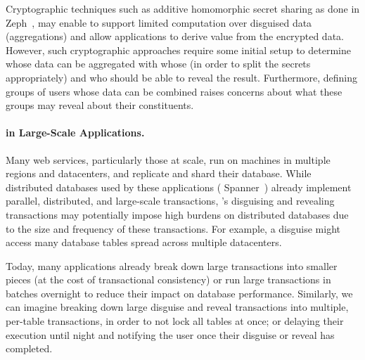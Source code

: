 
%
Cryptographic techniques such as additive homomorphic secret sharing as done in
Zeph~\cite{zeph}, may enable \sys to support limited computation over disguised
data (\eg aggregations) and allow applications to derive value from the
encrypted data.
%
However, such cryptographic approaches require some initial setup to determine
whose data can be aggregated with whose (in order to split the secrets
appropriately) and who should be able to reveal the result. Furthermore, defining
groups of users whose data can be combined raises concerns about what these
groups may reveal about their constituents.
%

\vspace{-5pt}
\paragraph{\sys in Large-Scale Applications.}
Many web services, particularly those at scale, run on machines in multiple 
regions and datacenters, and replicate and shard their database.
%
While distributed databases used by these applications (\eg
Spanner~\cite{spanner}) already implement parallel, distributed, and large-scale
transactions, \sys's disguising and revealing transactions may potentially
impose high burdens on distributed databases due to the size and frequency of
these transactions.
%
For example, a disguise might access many database tables spread across multiple
datacenters.
%

%
Today, many applications already break down large transactions into smaller
pieces (at the cost of transactional consistency) or run large transactions in
batches overnight to reduce their impact on database performance.
%
Similarly, we can imagine \sys breaking down large disguise and reveal transactions
into multiple, per-table transactions, in order to not lock all tables at once; or
delaying their execution until night and notifying the user once their
disguise or reveal has completed. 
%

\vspace{-3pt}
